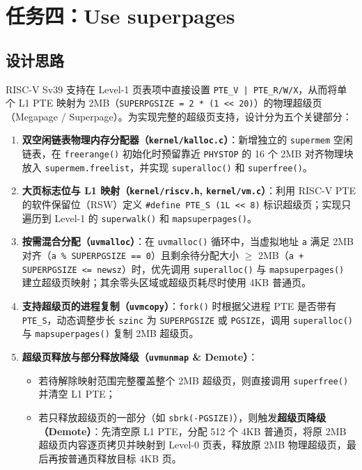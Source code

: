 \documentclass[12pt, a4paper]{ctexart}
\begin{document}
\section{任务四：Use superpages}

\subsection{设计思路}
RISC-V Sv39 支持在 Level-1 页表项中直接设置 \texttt{PTE\_V | PTE\_R/W/X}，从而将单个 L1 PTE 映射为 2MB（\texttt{SUPERPGSIZE = 2 * (1 << 20)}）的物理超级页（Megapage / Superpage）。为实现完整的超级页支持，设计分为五个关键部分：
\begin{enumerate}
    \item \textbf{双空闲链表物理内存分配器（\texttt{kernel/kalloc.c}）}：新增独立的 \texttt{supermem} 空闲链表，在 \texttt{freerange()} 初始化时预留靠近 \texttt{PHYSTOP} 的 16 个 2MB 对齐物理块放入 \texttt{supermem.freelist}，并实现 \texttt{superalloc()} 和 \texttt{superfree()}。
    \item \textbf{大页标志位与 L1 映射（\texttt{kernel/riscv.h}, \texttt{kernel/vm.c}）}：利用 RISC-V PTE 的软件保留位（RSW）定义 \texttt{\#define PTE\_S (1L << 8)} 标识超级页；实现只遍历到 Level-1 的 \texttt{superwalk()} 和 \texttt{mapsuperpages()}。
    \item \textbf{按需混合分配（\texttt{uvmalloc}）}：在 \texttt{uvmalloc()} 循环中，当虚拟地址 \texttt{a} 满足 2MB 对齐（\texttt{a \% SUPERPGSIZE == 0}）且剩余待分配大小 $\ge$ 2MB（\texttt{a + SUPERPGSIZE <= newsz}）时，优先调用 \texttt{superalloc()} 与 \texttt{mapsuperpages()} 建立超级页映射；其余零头区域或超级页耗尽时使用 4KB 普通页。
    \item \textbf{支持超级页的进程复制（\texttt{uvmcopy}）}：\texttt{fork()} 时根据父进程 PTE 是否带有 \texttt{PTE\_S}，动态调整步长 \texttt{szinc} 为 \texttt{SUPERPGSIZE} 或 \texttt{PGSIZE}，调用 \texttt{superalloc()} 与 \texttt{mapsuperpages()} 复制 2MB 超级页。
    \item \textbf{超级页释放与部分释放降级（\texttt{uvmunmap} \& Demote）}：
    \begin{itemize}
        \item 若待解除映射范围完整覆盖整个 2MB 超级页，则直接调用 \texttt{superfree()} 并清空 L1 PTE；
        \item 若只释放超级页的一部分（如 \texttt{sbrk(-PGSIZE)}），则触发\textbf{超级页降级（Demote）}：先清空原 L1 PTE，分配 512 个 4KB 普通页，将原 2MB 超级页内容逐页拷贝并映射到 Level-0 页表，释放原 2MB 物理超级页，最后再按普通页释放目标 4KB 页。
    \end{itemize}
\end{enumerate}
\end{document}
